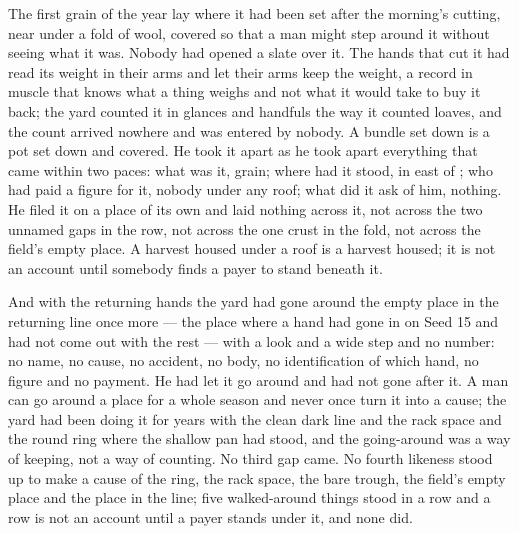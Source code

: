 The first grain of the year lay where it had been set after the morning's cutting, near  under a fold of wool, covered so that a man might step around it without seeing what it was. Nobody had opened a slate over it. The hands that cut it had read its weight in their arms and let their arms keep the weight, a record in muscle that knows what a thing weighs and not what it would take to buy it back; the yard counted it in glances and handfuls the way it counted loaves, and the count arrived nowhere and was entered by nobody. A bundle set down is a pot set down and covered. He took it apart as he took apart everything that came within two paces: what was it, grain; where had it stood, in  east of ; who had paid a figure for it, nobody under any roof; what did it ask of him, nothing. He filed it on a place of its own and laid nothing across it, not across the two unnamed gaps in the row, not across the one crust in the fold, not across the field's empty place. A harvest housed under a roof is a harvest housed; it is not an account until somebody finds a payer to stand beneath it.

And with the returning hands the yard had gone around the empty place in the returning line once more --- the place where a hand had gone in on Seed 15 and had not come out with the rest --- with a look and a wide step and no number: no name, no cause, no accident, no body, no identification of which hand, no figure and no payment. He had let it go around and had not gone after it. A man can go around a place for a whole season and never once turn it into a cause; the yard had been doing it for years with the clean dark line and the rack space and the round ring where the shallow pan had stood, and the going-around was a way of keeping, not a way of counting. No third gap came. No fourth likeness stood up to make a cause of the ring, the rack space, the bare trough, the field's empty place and the place in the line; five walked-around things stood in a row and a row is not an account until a payer stands under it, and none did.

\scenebreak

